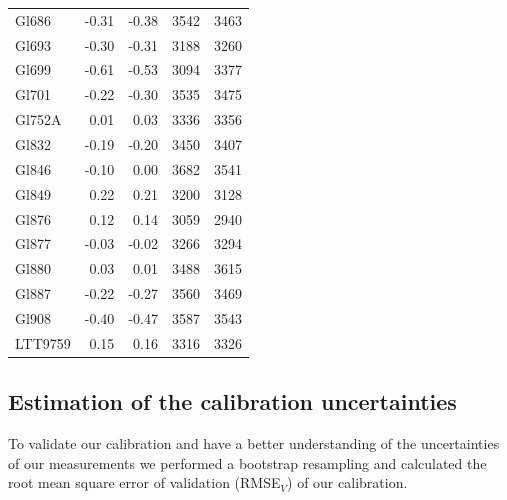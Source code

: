 \documentclass{aa}
\begin{document}
\begin{table}[h!]
{\begin{tabular}{ l r r r r}
Gl686 & -0.31 & -0.38 & 3542 & 3463 \\
Gl693 & -0.30 & -0.31 & 3188 & 3260 \\
Gl699 & -0.61 & -0.53 & 3094 & 3377 \\
Gl701 & -0.22 & -0.30 & 3535 & 3475 \\
Gl752A & 0.01 & 0.03 & 3336 & 3356 \\
Gl832 & -0.19 & -0.20 & 3450 & 3407 \\
Gl846 & -0.10 & 0.00 & 3682 & 3541 \\
Gl849 & 0.22 & 0.21 & 3200 & 3128 \\
Gl876 & 0.12 & 0.14 & 3059 & 2940 \\
Gl877 & -0.03 & -0.02 & 3266 & 3294 \\
Gl880 & 0.03 & 0.01 & 3488 & 3615 \\
Gl887 & -0.22 & -0.27 & 3560 & 3469 \\
Gl908 & -0.40 & -0.47 & 3587 & 3543 \\
LTT9759 & 0.15 & 0.16 & 3316 & 3326 \\
\hline
\end{tabular}}
\end{table}















\subsection{Estimation of the calibration uncertainties}
\label{sec:uncertain}
To validate our calibration and have a better understanding of the uncertainties of our measurements we performed a bootstrap resampling and calculated the root mean square error of validation (RMSE$_{V}$) of our calibration. 
\end{document}

